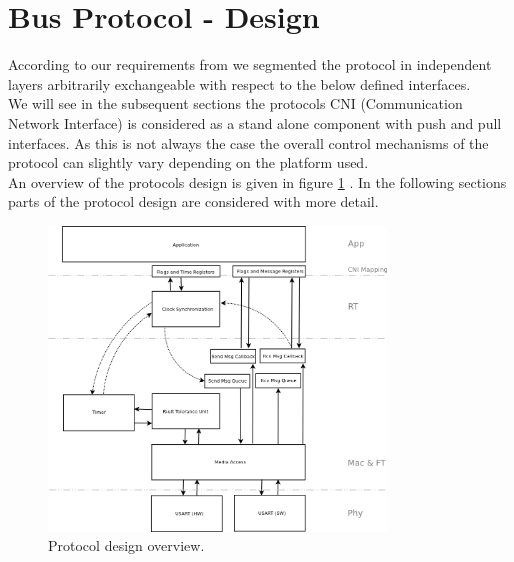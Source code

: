 \section{Bus Protocol - Design}
\label{sec:bus:design}
According to our requirements from \cite[NESD1]{NESD1} we segmented the protocol in 
independent layers arbitrarily exchangeable with respect to the below defined interfaces.\\

We will see in the subsequent sections the protocols CNI (Communication Network Interface) 
is considered as a stand alone component with push and pull interfaces.
As this is not always the case the overall control mechanisms of the 
protocol can slightly vary depending on the platform used.\\

An overview of the protocols design is given in figure 
\ref{fig:bus:design:overview} . 
In the following sections parts of the protocol design are considered with more detail.

\begin{figure}[h]
\centering
\includegraphics[width=0.8\textwidth]{../images/protocol_design_overview.png}
\caption{Protocol design overview.}
\label{fig:bus:design:overview}
\end{figure}





